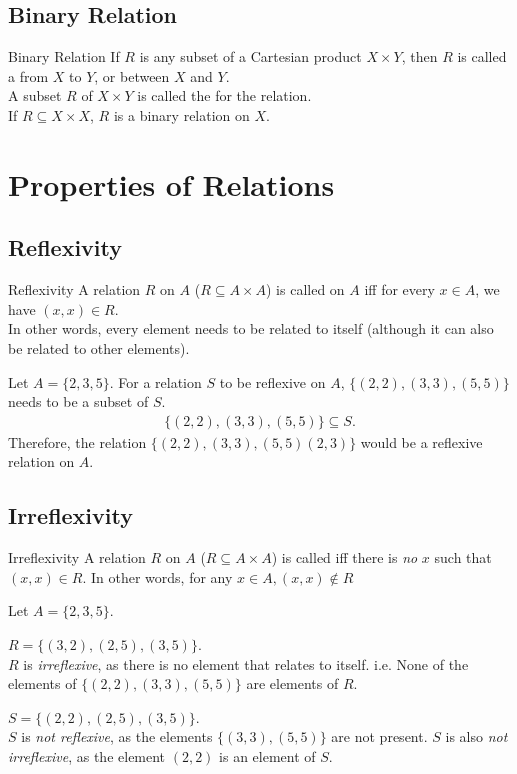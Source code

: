\documentclass[../notes.tex]{subfiles}
\begin{document}
			\subsection{Binary Relation}
				\begin{definition}{Binary Relation}
					If $R$ is any subset of a Cartesian product $X \times Y$, then $R$ is called a  from $X$ to $Y$, or between $X$ and $Y$.\\
					A subset $R$ of $X \times Y$ is called the  for the relation.\\
					If $R \subseteq X \times X$, $R$ is a binary relation on $X$.
				\end{definition}
			\pagebreak
		\section{Properties of Relations}
			\subsection{Reflexivity}
			\begin{definition}{Reflexivity}
				A relation $R$ on $A$ ($R \subseteq A \times A$) is called  on $A$ iff for every $x \in A$, we have $(x, x) \in R$.\\
				In other words, every element needs to be related to itself (although it can also be related to other elements).
			\end{definition}
				\begin{example}
					Let $A = \{2, 3, 5\}$. For a relation $S$ to be reflexive on $A$, $\bigl\{(2, 2), (3, 3), (5, 5)\bigr\}$ needs to be a subset of $S$.
						\begin{align*}
							\bigl\{(2, 2), (3, 3), (5, 5)\bigr\} \subseteq S.
						\end{align*}
					Therefore, the relation $\bigl\{(2, 2), (3, 3), (5, 5) (2, 3)\bigr\}$ would be a reflexive relation on $A$.
				\end{example}
			\subsection{Irreflexivity}
				\begin{definition}{Irreflexivity}
					A relation $R$ on $A$ ($R \subseteq A \times A$) is called  iff there is \emph{no} $x$ such that $(x, x) \in R$. In other words, for any $x \in A, (x, x) \notin R$
				\end{definition}
				\begin{example}
					Let $A = \{2, 3, 5\}$.

					$R = \bigl\{(3, 2), (2, 5), (3, 5)\bigr\}$.\\
					$R$ is \emph{irreflexive}, as there is no element that relates to itself. i.e. None of the elements of $\bigl\{(2, 2), (3, 3), (5, 5)\bigr\}$ are elements of $R$.

					$S = \bigl\{(2, 2), (2, 5), (3, 5)\bigr\}$.\\
					$S$ is \emph{not reflexive}, as the elements $\bigl\{(3, 3), (5, 5)\bigr\}$ are not present. $S$ is also \emph{not irreflexive}, as the element $(2, 2)$ is an element of $S$.
				\end{example}
\end{document}
